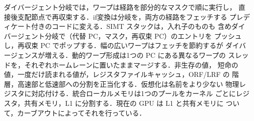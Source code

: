 \documentclass[../main.tex]{subfiles}
\begin{document}
\begin{keypoint}[章のまとめ]
  ダイバージェント分岐では，ワープは経路を部分的なマスクで順に実行し，
  直接後支配節点で再収束する．if変換は分岐を，両方の経路をフェッチする
  プレディケート付きのコードに変える．SIMT スタックは，入れ子のものも
  含めダイバージェント分岐で（代替 PC，マスク，再収束 PC）のエントリを
  プッシュし，再収束 PC でポップする．幅の広いワープはフェッチを節約するが
  ダイバージェンスが増える．動的ワープ形成は1つの PC にある異なるワープの
  スレッドを，それぞれホームレーンに置いたままマージする．非生存の値，
  短命の値，一度だけ読まれる値が，レジスタファイルキャッシュ，ORF/LRF の
  階層，高速部と低速部への分割を正当化する．仮想化は名前をより少ない
  物理レジスタに対応付ける．統合ローカルメモリは1つのプールをカーネル
  ごとにレジスタ，共有メモリ，L1 に分割する．現在の GPU は L1 と共有メモリに
  ついて，カーブアウトによってそれを行っている．
\end{keypoint}
\end{document}
